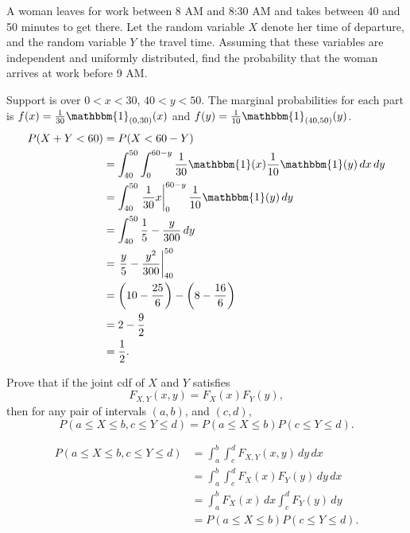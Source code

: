 \documentclass[12pt,letterpaper]{exam}
\begin{document}
\begin{questions}
\begin{solution}
\begin{parts}
		\end{parts}
	\end{solution}

	\setcounter{question}{6}
	\question 
	A woman leaves for work between 8 AM and 8:30 AM and takes between 40 and 50 
	minutes to get there. Let the random variable \(X\) denote her time of departure, and
	the random variable \(Y\) the travel time. Assuming that these variables are independent
	and uniformly distributed, find the probability that the woman arrives at work before
	9 AM.
	
	\begin{solution}
		Support is over \(0<x<30\), \(40<y<50\). The marginal probabilities for each part is		
		\(f(x) = \frac{1}{30} \mathbbm{1}_{(0,30)}(x)\) 
		and
		\(f(y) = \frac{1}{10} \mathbbm{1}_{(40,50)}(y)\).
		\begin{align*}
			P(X+Y<60)
			&= P(X<60-Y) \\
			&= \int_{40}^{50} \int_{0}^{60-y} \frac{1}{30} \mathbbm{1}(x) \frac{1}{10} \mathbbm{1}(y) \,dx \,dy \\
			&= \int_{40}^{50} \left. \frac{1}{30}x \right|_{0}^{60-y} \frac{1}{10} \mathbbm{1}(y) \,dy \\
			&= \int_{40}^{50} \frac{1}{5} - \frac{y}{300} \,dy \\
			&= \left. \frac{y}{5} - \frac{y^2}{300} \right|_{40}^{50} \\
			&= \left(10 - \frac{25}{6}\right) - \left(8 - \frac{16}{6}\right) \\
			&= 2 - \frac{9}{2} \\
			&= \frac{1}{2} .
		\end{align*}
		
	\end{solution}
	\clearpage
	
	\setcounter{question}{8}
	\question 
	Prove that if the joint cdf of \(X\) and \(Y\) satisfies
		\[F_{X,Y} (x,y) = F_X(x)F_Y(y),\]
	then for any pair of intervals \((a, b)\), and \((c, d)\),
		\[P(a \leq X \leq b, c \leq Y \leq d) = P(a \leq X \leq b)P(c \leq Y \leq d).\]
	
	\begin{solution}
		\begin{align*}
			P(a \leq X \leq b, c \leq Y \leq d) 
			&=\int_{a}^{b} \int_{c}^{d} F_{X,Y} (x,y) \,dy \,dx \\
			&=\int_{a}^{b} \int_{c}^{d} F_X(x)F_Y(y) \,dy \,dx \\
			&=\int_{a}^{b} F_X(x) \,dx \int_{c}^{d} F_Y(y) \,dy \\
			&= P(a \leq X \leq b)P(c \leq Y \leq d).
		\end{align*}
	\end{solution}


\end{questions}
\end{document}
